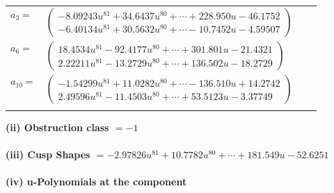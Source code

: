 \documentclass[1p]{elsarticle_modified}
\theoremstyle{definition}
\begin{document}
\begin{tabular}{m{7pt} m{180pt} m{7pt} m{180pt} }
\flushright $a_{3}=$&$\begin{pmatrix}-8.09243 u^{81}+34.6437 u^{80}+\cdots+228.950 u-46.1752\\-6.40134 u^{81}+30.5632 u^{80}+\cdots-10.7452 u-4.59507\end{pmatrix}$ \\
\flushright $a_{6}=$&$\begin{pmatrix}18.4534 u^{81}-92.4177 u^{80}+\cdots+301.801 u-21.4321\\2.22211 u^{81}-13.2729 u^{80}+\cdots+136.502 u-18.2729\end{pmatrix}$ \\
\flushright $a_{10}=$&$\begin{pmatrix}-1.54299 u^{81}+11.0282 u^{80}+\cdots-136.510 u+14.2742\\2.49596 u^{81}-11.4503 u^{80}+\cdots+53.5123 u-3.37749\end{pmatrix}$\\&\end{tabular}
\flushleft \textbf{(ii) Obstruction class $= -1$}\\~\\
\flushleft \textbf{(iii) Cusp Shapes $= -2.97826 u^{81}+10.7782 u^{80}+\cdots+181.549 u-52.6251$}\\~\\
\newpage\renewcommand{\arraystretch}{1}
\flushleft \textbf{(iv) u-Polynomials at the component}\newline \\
\end{document}
